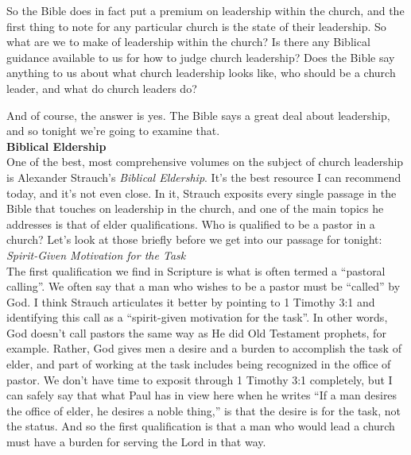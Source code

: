 \documentclass[letterpaper, 12pt]{article}
\begin{document}
    So the Bible does in fact put a premium on leadership within the
    church, and the first thing to note for any particular church is the
    state of their leadership. So what are we to make of leadership
    within the church? Is there any Biblical guidance available to us
    for how to judge church leadership? Does the Bible say anything to
    us about what church leadership looks like, who should be a church
    leader, and what do church leaders do? 

    And of course, the answer is yes. The Bible says a great deal about
    leadership, and so tonight we're going to examine that. \\

    \noindent \textbf{Biblical Eldership} \\

    One of the best, most comprehensive volumes on the subject of church
    leadership is Alexander Strauch's \emph{Biblical Eldership}. It's
    the best resource I can recommend today, and it's not even close. In
    it, Strauch exposits every single passage in the Bible that touches
    on leadership in the church, and one of the main topics he addresses
    is that of elder qualifications. Who is qualified to be a pastor in
    a church? Let's look at those briefly before we get into our passage
    for tonight: \\

    \noindent \emph{Spirit-Given Motivation for the Task} \\

    The first qualification we find in Scripture is what is often termed
    a ``pastoral calling''. We often say that a man who wishes to be a
    pastor must be ``called'' by God. I think Strauch articulates it
    better by pointing to 1 Timothy 3:1 and identifying this call as a
    ``spirit-given motivation for the task''. In other words, God
    doesn't call pastors the same way as He did Old Testament prophets,
    for example. Rather, God gives men a desire and a burden to
    accomplish the task of elder, and part of working at the task
    includes being recognized in the office of pastor. We don't have
    time to exposit through 1 Timothy 3:1 completely, but I can safely
    say that what Paul has in view here when he writes ``If a man
    desires the office of elder, he desires a noble thing,'' is that the
    desire is for the task, not the status. And so the first
    qualification is that a man who would lead a church must have a
    burden for serving the Lord in that way. \\
\end{document}
